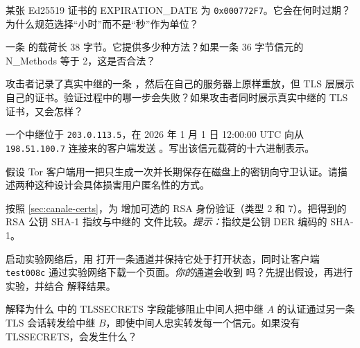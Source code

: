 \begin{esercizio}[1]\label{es:07-scadenza}
某张 Ed25519 证书的 EXPIRATION\_DATE 为 \texttt{0x000772F7}。它会在何时过期？为什么规范选择“小时”而不是“秒”作为单位？
\end{esercizio}

\begin{esercizio}[1]\label{es:07-authchallenge}
一条  的载荷长 38 字节。它提供多少种方法？如果一条 36 字节信元的 N\_Methods 等于 2，这是否合法？
\end{esercizio}

\begin{esercizio}[2]\label{es:07-impostore}
攻击者记录了真实中继的一条 ，然后在自己的服务器上原样重放，但 TLS 层展示自己的证书。验证过程中的哪一步会失败？如果攻击者同时展示真实中继的 TLS 证书，又会怎样？
\end{esercizio}

\begin{esercizio}[2]\label{es:07-netinfo}
一个中继位于 \texttt{203.0.113.5}，在 2026 年 1 月 1 日 12:00:00 UTC 向从 \texttt{198.51.100.7} 连接来的客户端发送 。写出该信元载荷的十六进制表示。
\end{esercizio}

\begin{esercizio}[2]\label{es:07-client-auth}
假设 Tor 客户端用一把只生成一次并长期保存在磁盘上的密钥向守卫认证。请描述两种这种设计会具体损害用户匿名性的方式。
\end{esercizio}

\begin{esercizio}[2]\label{es:07-rsa}
按照 \cref{sec:canale-certs}，为  增加可选的 RSA 身份验证（类型 2 和 7）。把得到的 RSA 公钥 SHA-1 指纹与中继的  文件比较。\emph{提示：}指纹是公钥 DER 编码的 SHA-1。
\end{esercizio}

\begin{esercizio}[3]\label{es:07-padding}
启动实验网络后，用  打开一条通道并保持它处于打开状态，同时让客户端 \texttt{test008c} 通过实验网络下载一个页面。\emph{你的}通道会收到  吗？先提出假设，再进行实验，并结合  解释结果。
\end{esercizio}

\begin{esercizio}[3]\label{es:07-mitm}
解释为什么  中的 TLSSECRETS 字段能够阻止中间人把中继 $A$ 的认证通过另一条 TLS 会话转发给中继 $B$，即使中间人忠实转发每一个信元。如果没有 TLSSECRETS，会发生什么？
\end{esercizio}

